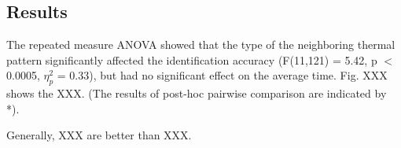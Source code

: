 \documentclass[preprint,12pt]{elsarticle}
\begin{document}
\subsection{Results}
The repeated measure ANOVA showed that the type of the neighboring thermal pattern significantly affected the identification accuracy (F(11,121) = 5.42, p $<$ 0.0005, $\eta_p^2$ = 0.33), but had no significant effect on the average time. Fig. XXX shows the XXX. (The results of post-hoc pairwise comparison are indicated by *).

Generally, XXX are better than XXX.

\end{document}
